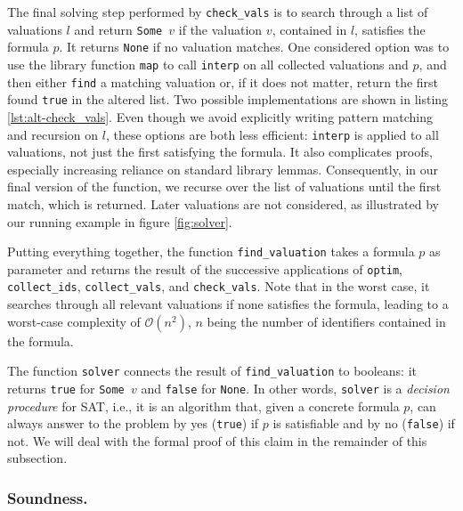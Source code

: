 The final solving step performed by \texttt{check\_vals} is to search through a list of valuations $l$ and return \texttt{Some $v$} if the valuation $v$, contained in $l$, satisfies the formula $p$.
It returns \texttt{None} if no valuation matches.
One considered option was to use the library function \texttt{map} to call \texttt{interp} on all collected valuations and $p$, and then either \texttt{find} a matching valuation or, if it does not matter, return the first found \texttt{true} in the altered list.
Two possible implementations are shown in listing \ref{lst:alt-check_vals}.
Even though we avoid explicitly writing pattern matching and recursion on $l$, these options are both less efficient: \texttt{interp} is applied to all valuations, not just the first satisfying the formula.
It also complicates proofs, especially increasing reliance on standard library lemmas.
Consequently, in our final version of the function, we recurse over the list of valuations until the first match, which is returned.
Later valuations are not considered, as illustrated by our running example in figure \ref{fig:solver}.

Putting everything together, the function \texttt{find\_valuation} takes a formula $p$ as parameter and returns the result of the successive applications of \texttt{optim}, \texttt{collect\_ids}, \texttt{collect\_vals}, and \texttt{check\_vals}.
Note that in the worst case, it searches through all relevant valuations if none satisfies the formula, leading to a worst-case complexity of $\mathcal{O}(n^2)$, $n$ being the number of identifiers contained in the formula.

The function \texttt{solver} connects the result of \texttt{find\_valuation} to booleans: it returns \texttt{true} for \texttt{Some $v$} and \texttt{false} for \texttt{None}.
In other words, \texttt{solver} is a \emph{decision procedure} \cite{kroening2016decision} for SAT, i.e., it is an algorithm that, given a concrete formula $p$, can always answer to the problem by yes (\texttt{true}) if $p$ is satisfiable and by no (\texttt{false}) if not.
We will deal with the formal proof of this claim in the remainder of this subsection.

\subsubsection{Soundness.}

